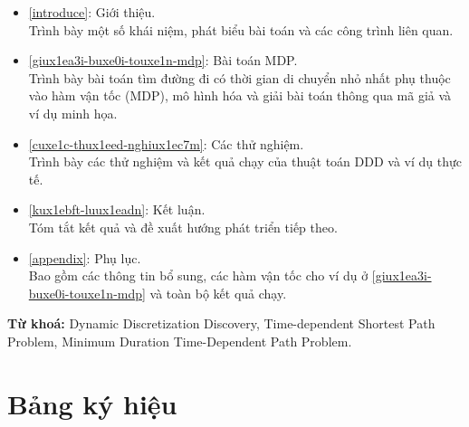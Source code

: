 \documentclass[fontsize=14pt,DIV=15pt,twoside=false]{scrbook}
\begin{document}
\begin{itemize}
    \item \autoref{introduce}: Giới thiệu.\\
        Trình bày một số khái niệm, phát biểu bài toán và các công trình liên quan.
    \item \autoref{giux1ea3i-buxe0i-touxe1n-mdp}: Bài toán MDP. \\
        Trình bày bài toán tìm đường đi có thời gian di chuyển nhỏ nhất phụ thuộc vào hàm vận tốc (MDP), mô hình hóa và giải bài toán thông qua mã giả và ví dụ minh họa.
    
    
    \item \autoref{cuxe1c-thux1eed-nghiux1ec7m}: Các thử nghiệm.\\
        Trình bày các thử nghiệm và kết quả chạy của thuật toán DDD và ví dụ thực tế.
    
    \item \autoref{kux1ebft-luux1eadn}: Kết luận.\\
        Tóm tắt kết quả và đề xuất hướng phát triển tiếp theo.
    \item \autoref{appendix}: Phụ lục.\\
        Bao gồm các thông tin bổ sung, các hàm vận tốc cho ví dụ ở \autoref{giux1ea3i-buxe0i-touxe1n-mdp} và toàn bộ kết quả chạy.

\end{itemize}

\textbf{Từ khoá:} Dynamic Discretization Discovery, Time-dependent Shortest Path Problem, Minimum Duration Time-Dependent Path Problem.

\chapter*{Bảng ký hiệu}\label{bang-ky-hieu}

\end{document}

